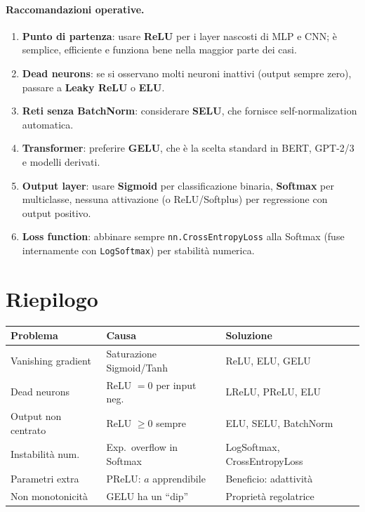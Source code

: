 \paragraph{Raccomandazioni operative.}
\begin{enumerate}
  \item \textbf{Punto di partenza}: usare \textbf{ReLU} per i layer nascosti
        di MLP e CNN; è semplice, efficiente e funziona bene nella maggior parte
        dei casi.
  \item \textbf{Dead neurons}: se si osservano molti neuroni inattivi (output
        sempre zero), passare a \textbf{Leaky ReLU} o \textbf{ELU}.
  \item \textbf{Reti senza BatchNorm}: considerare \textbf{SELU}, che fornisce
        self-normalization automatica.
  \item \textbf{Transformer}: preferire \textbf{GELU}, che è la scelta standard
        in BERT, GPT-2/3 e modelli derivati.
  \item \textbf{Output layer}: usare \textbf{Sigmoid} per classificazione binaria,
        \textbf{Softmax} per multiclasse, nessuna attivazione (o ReLU/Softplus)
        per regressione con output positivo.
  \item \textbf{Loss function}: abbinare sempre \texttt{nn.CrossEntropyLoss}
        alla Softmax (fuse internamente con \texttt{LogSoftmax}) per stabilità
        numerica.
\end{enumerate}

\section{Riepilogo}
\label{sec:summary-ch3}

\begin{center}
\small
\begin{tabularx}{\linewidth}{l l X}
  \toprule
  \textbf{Problema} & \textbf{Causa} & \textbf{Soluzione} \\
  \midrule
  Vanishing gradient  & Saturazione Sigmoid/Tanh  & ReLU, ELU, GELU \\
  Dead neurons        & ReLU $=0$ per input neg.  & LReLU, PReLU, ELU \\
  Output non centrato & ReLU $\geq 0$ sempre      & ELU, SELU, BatchNorm \\
  Instabilità num.    & Exp.\ overflow in Softmax & LogSoftmax, CrossEntropyLoss \\
  Parametri extra     & PReLU: $a$ apprendibile   & Beneficio: adattività \\
  Non monotonicità    & GELU ha un ``dip''         & Proprietà regolatrice \\
  \bottomrule
\end{tabularx}
\end{center}

